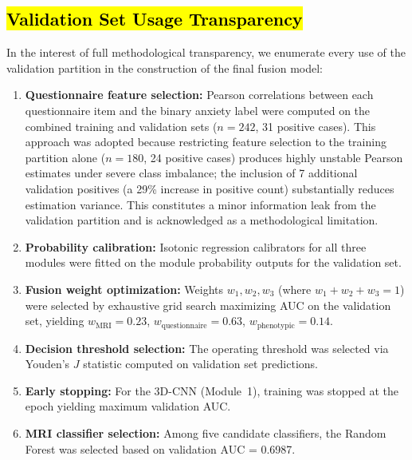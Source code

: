 \documentclass[10pt,letterpaper]{article}
\newcommand{\hlpar}[1]{\leavevmode\colorbox{yellow!30}{\parbox{\dimexpr\linewidth-2\fboxsep\relax}{#1}}\vspace{2pt}}
\begin{document}
                                                                                                                  \subsection*{\hl{Validation Set Usage Transparency}}
                                                                                                          \hlpar{In the interest of full methodological transparency, we enumerate every use of the validation partition in the construction of the final fusion model:}
                                                                                                          \begin{enumerate}
                                                                                                              \item \hlpar{\textbf{Questionnaire feature selection:} Pearson correlations between each questionnaire item and the binary anxiety label were computed on the combined training and validation sets ($n = 242$, 31 positive cases). This approach was adopted because restricting feature selection to the training partition alone ($n = 180$, 24 positive cases) produces highly unstable Pearson estimates under severe class imbalance; the inclusion of 7 additional validation positives (a 29\% increase in positive count) substantially reduces estimation variance. This constitutes a minor information leak from the validation partition and is acknowledged as a methodological limitation.}
                                                                                                              \item \hlpar{\textbf{Probability calibration:} Isotonic regression calibrators for all three modules were fitted on the module probability outputs for the validation set.}
                                                                                                              \item \hlpar{\textbf{Fusion weight optimization:} Weights $w_1, w_2, w_3$ (where $w_1 + w_2 + w_3 = 1$) were selected by exhaustive grid search maximizing AUC on the validation set, yielding $w_{\text{MRI}} = 0.23$, $w_{\text{questionnaire}} = 0.63$, $w_{\text{phenotypic}} = 0.14$.}
                                                                                                              \item \hlpar{\textbf{Decision threshold selection:} The operating threshold was selected via Youden's $J$ statistic computed on validation set predictions.}
                                                                                                              \item \hlpar{\textbf{Early stopping:} For the 3D-CNN (Module~1), training was stopped at the epoch yielding maximum validation AUC.}
                                                                                                              \item \hlpar{\textbf{MRI classifier selection:} Among five candidate classifiers, the Random Forest was selected based on validation AUC = 0.6987.}
                                                                                                          \end{enumerate}
\end{document}
